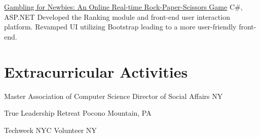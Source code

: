 \documentclass[11pt,a4paper,sans]{moderncv}   %
\begin{document}
{\href{https://github.com/cz764/GamblingForNewbies}{Gambling for Newbies: An Online Real-time Rock-Paper-Scissors Game}}
{C\#, ASP.NET}
{}{}
{
	{Developed the Ranking module and front-end user interaction platform.}
	\newline
	{Revamped UI utilizing Bootstrap leading to a more user-friendly front-end.}
}

\section{Extracurricular Activities}
{Master Association of Computer Science}
{Director of Social Affairs}
{NY}{}{}


{True Leadership Retreat}
{}
{Pocono Mountain, PA}
{}{}

{Techweek NYC}
{Volunteer}
{NY}
{}{}


\renewcommand{\baselinestretch}{1.25}

\closesection{}                   %
\renewcommand{\listitemsymbol}{-} %
\end{document}
